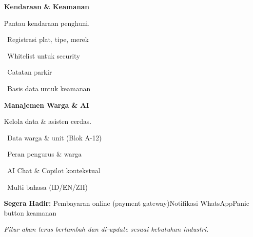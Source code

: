 \documentclass[a4paper]{article}
\begin{document}
\noindent
\begin{minipage}[t]{0.485\textwidth}
    \colorbox{OrangePrimary}{%
        \begin{minipage}{\dimexpr\textwidth-2\fboxsep\relax}
            {\fontsize{10}{13}\selectfont\bfseries\color{White} Kendaraan \& Keamanan}
        \end{minipage}}\par
    \vspace{4pt}
    {\fontsize{9}{12}\selectfont\color{TextDark}%
    Pantau kendaraan penghuni.\par\vspace{3pt}
    \textbullet\ Registrasi plat, tipe, merek\par\vspace{2pt}%
    \textbullet\ Whitelist untuk security\par\vspace{2pt}%
    \textbullet\ Catatan parkir\par\vspace{2pt}%
    \textbullet\ Basis data untuk keamanan}%

\end{minipage}%
\hfill
\begin{minipage}[t]{0.485\textwidth}
    \colorbox{EmeraldDark}{%
        \begin{minipage}{\dimexpr\textwidth-2\fboxsep\relax}
            {\fontsize{10}{13}\selectfont\bfseries\color{White} Manajemen Warga \& AI}
        \end{minipage}}\par
    \vspace{4pt}
    {\fontsize{9}{12}\selectfont\color{TextDark}%
    Kelola data \& asisten cerdas.\par\vspace{3pt}
    \textbullet\ Data warga \& unit (Blok A-12)\par\vspace{2pt}%
    \textbullet\ Peran pengurus \& warga\par\vspace{2pt}%
    \textbullet\ AI Chat \& Copilot kontekstual\par\vspace{2pt}%
    \textbullet\ Multi-bahasa (ID/EN/ZH)}%

\end{minipage}

\vspace{8pt}

{\setlength{\fboxsep}{8pt}\setlength{\fboxrule}{0pt}%
\noindent\colorbox{BlueBg}{%
    \begin{minipage}{\dimexpr\textwidth-2\fboxsep\relax}
        {\fontsize{9}{12}\selectfont\bfseries\color{BlueDark} Segera Hadir:}\enspace
        {\fontsize{9}{12}\selectfont\color{TextDark} Pembayaran online (payment gateway)\enspace\textcolor{BluePrimary}{\textbullet}\enspace Notifikasi WhatsApp\enspace\textcolor{BluePrimary}{\textbullet}\enspace Panic button keamanan}\par\vspace{3pt}
        {\fontsize{8.5}{11}\selectfont\color{TextLight}\textit{Fitur akan terus bertambah dan di-update sesuai kebutuhan industri.}}
    \end{minipage}}}
\end{document}
